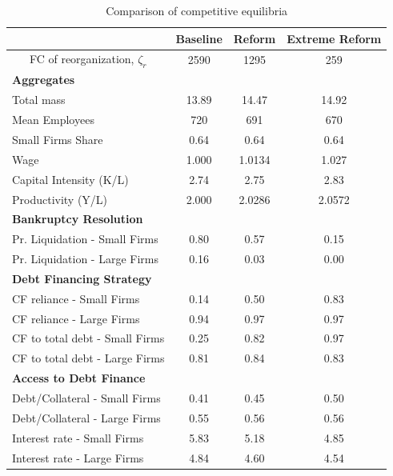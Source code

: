 \documentclass[12pt]{article}
\begin{document}
\begin{table}[H]
    \centering
    \begin{tabular}{lccc}
    & \textbf{Baseline} & \textbf{Reform} & \textbf{Extreme Reform} \\    
    \toprule
    \multicolumn{1}{c}{FC of reorganization, $\zeta_{r}$} & 2590 & 1295 & 259  \vspace{3mm} \\  
    \multicolumn{4}{l}{\textbf{Aggregates}} \\ \hline
    Total mass & 13.89 & 14.47 & 14.92  \\
    Mean Employees & 720 & 691 & 670  \\
    Small Firms Share  & 0.64 & 0.64 & 0.64  \\
    Wage & 1.000 & 1.0134 & 1.027  \\
    Capital Intensity (K/L) & 2.74 & 2.75 & 2.83  \\
    Productivity (Y/L) & 2.000 & 2.0286 & 2.0572  \vspace{3mm} \\  
    \multicolumn{4}{l}{\textbf{Bankruptcy Resolution}} \\ \hline
    Pr. Liquidation - Small Firms & 0.80 & 0.57 & 0.15  \\
    Pr. Liquidation - Large Firms & 0.16 & 0.03 & 0.00  \vspace{3mm} \\  
    \multicolumn{4}{l}{\textbf{Debt Financing Strategy}} \\ \hline
    CF reliance - Small Firms & 0.14 & 0.50 & 0.83  \\
    CF reliance - Large Firms & 0.94 & 0.97 & 0.97  \vspace{1mm} \\  
    CF to total debt - Small Firms & 0.25 & 0.82 & 0.97  \\
    CF to total debt - Large Firms & 0.81 & 0.84 & 0.83  \vspace{3mm} \\  
    \multicolumn{4}{l}{\textbf{Access to Debt Finance}} \\ \hline
    Debt/Collateral - Small Firms & 0.41 & 0.45 & 0.50 \\
    Debt/Collateral - Large Firms & 0.55 & 0.56 & 0.56  \vspace{1mm} \\  
    Interest rate - Small Firms & 5.83 & 5.18 & 4.85  \\
    Interest rate - Large Firms & 4.84 & 4.60 & 4.54  \\  \bottomrule
    \end{tabular}
    \caption{Comparison of competitive equilibria}
    \label{tab:SSvalues}
\end{table} \newpage
\end{document}
